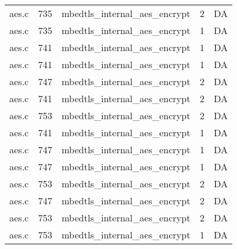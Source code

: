 \begin{table}[h]
{\begin{tabular}{clrrr}
aes.c&735&mbedtls\_internal\_aes\_encrypt&2 &DA\\
aes.c&735&mbedtls\_internal\_aes\_encrypt&1 &DA\\
aes.c&741&mbedtls\_internal\_aes\_encrypt&1 &DA\\
aes.c&741&mbedtls\_internal\_aes\_encrypt&1 &DA\\
aes.c&747&mbedtls\_internal\_aes\_encrypt&2 &DA\\
aes.c&741&mbedtls\_internal\_aes\_encrypt&2 &DA\\
aes.c&753&mbedtls\_internal\_aes\_encrypt&2 &DA\\
aes.c&741&mbedtls\_internal\_aes\_encrypt&1 &DA\\
aes.c&747&mbedtls\_internal\_aes\_encrypt&1 &DA\\
aes.c&747&mbedtls\_internal\_aes\_encrypt&1 &DA\\
aes.c&753&mbedtls\_internal\_aes\_encrypt&2 &DA\\
aes.c&747&mbedtls\_internal\_aes\_encrypt&2 &DA\\
aes.c&753&mbedtls\_internal\_aes\_encrypt&2 &DA\\
aes.c&753&mbedtls\_internal\_aes\_encrypt&1 &DA\\
\hline
\end{tabular}
}
\end{table}